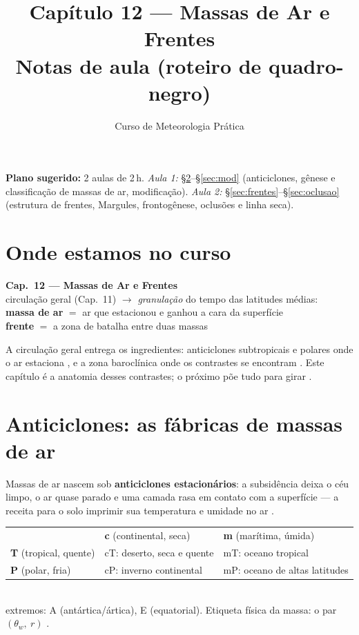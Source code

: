 \documentclass[11pt]{article}
\title{Capítulo 12 --- Massas de Ar e Frentes\\
{\large Notas de aula (roteiro de quadro-negro)}}
\author{Curso de Meteorologia Prática}
\date{}
\begin{document}
\maketitle
\thispagestyle{fancy}

\noindent\textbf{Plano sugerido:} 2 aulas de 2\,h.
\emph{Aula 1:} \S\ref{sec:massas}--\S\ref{sec:mod} (anticiclones, gênese e
classificação de massas de ar, modificação).
\emph{Aula 2:} \S\ref{sec:frentes}--\S\ref{sec:oclusao} (estrutura de
frentes, Margules, frontogênese, oclusões e linha seca).

\section{Onde estamos no curso}

\begin{noquadro}[abertura]
\textbf{Cap.~12 --- Massas de Ar e Frentes}\\[2pt]
circulação geral (Cap.~11) $\to$ \emph{granulação} do tempo das
latitudes médias:\\
\textbf{massa de ar} $=$ ar que estacionou e ganhou a cara da
superfície\\
\textbf{frente} $=$ a zona de batalha entre duas massas
\end{noquadro}

A circulação geral entrega os ingredientes: anticiclones subtropicais e
polares onde o ar estaciona , e a zona
baroclínica onde os contrastes se encontram . Este capítulo é a anatomia desses contrastes; o próximo põe tudo
para girar .

\section{Anticiclones: as fábricas de massas de ar}\label{sec:massas}


Massas de ar nascem sob \textbf{anticiclones estacionários}: a
subsidência  deixa o céu limpo, o ar
quase parado e uma camada rasa em contato com a superfície — a receita
para o solo imprimir sua temperatura e umidade no ar
.

\begin{noquadro}
\begin{tabular}{lll}
 & \textbf{c} (continental, seca) & \textbf{m} (marítima, úmida)\\
\textbf{T} (tropical, quente) & cT: deserto, seca e quente & mT:
oceano tropical\\
\textbf{P} (polar, fria) & cP: inverno continental & mP: oceano de
altas latitudes\\
\end{tabular}\\[3pt]
extremos: A (antártica/ártica), E (equatorial). Etiqueta física da
massa: o par $(\theta_w,\ r)$ .
\end{noquadro}
\end{document}
